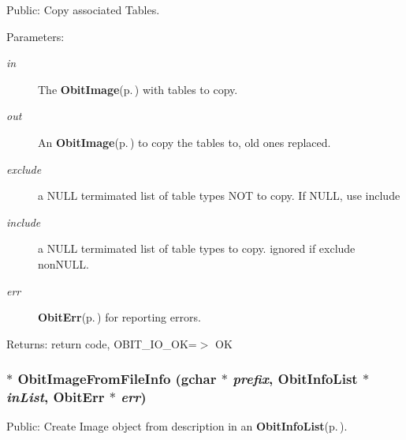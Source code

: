 Public: Copy associated Tables. 

\begin{Desc}
\item[Parameters:]
\begin{description}
\item[{\em in}]The {\bf Obit\-Image}{\rm (p.\,\pageref{structObitImage})} with tables to copy. \item[{\em out}]An {\bf Obit\-Image}{\rm (p.\,\pageref{structObitImage})} to copy the tables to, old ones replaced. \item[{\em exclude}]a NULL termimated list of table types NOT to copy. If NULL, use include \item[{\em include}]a NULL termimated list of table types to copy. ignored if exclude non\-NULL. \item[{\em err}]{\bf Obit\-Err}{\rm (p.\,\pageref{structObitErr})} for reporting errors. \end{description}
\end{Desc}
\begin{Desc}
\item[Returns:]return code, OBIT\_\-IO\_\-OK=$>$ OK \end{Desc}
\subsubsection{$\ast$ Obit\-Image\-From\-File\-Info (gchar $\ast$ {\em prefix}, {\bf Obit\-Info\-List} $\ast$ {\em in\-List}, {\bf Obit\-Err} $\ast$ {\em err})}\label{ObitImage_8c_a10}


Public: Create Image object from description in an {\bf Obit\-Info\-List}{\rm (p.\,\pageref{structObitInfoList})}. 

